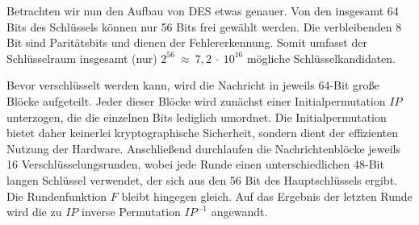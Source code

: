 Betrachten wir nun den Aufbau von DES etwas genauer. Von den insgesamt
64 Bits des Schlüssels können nur 56 Bits frei gewählt werden. Die
verbleibenden 8 Bit sind Paritätsbits und dienen der
Fehlererkennung. Somit umfasst der Schlüsselraum insgesamt (nur)
$2^{56}~\approx~7,2~\cdot~10^{16}$ mögliche Schlüsselkandidaten. 

Bevor verschlüsselt werden kann, wird die Nachricht in jeweils 64-Bit
große Blöcke aufgeteilt. Jeder dieser Blöcke wird zunächst einer
Initialpermutation $IP$ unterzogen, die die einzelnen Bits lediglich
umordnet. Die Initialpermutation bietet daher keinerlei kryptographische
Sicherheit, sondern dient der effizienten Nutzung der
Hardware. Anschließend durchlaufen die Nachrichtenblöcke jeweils 16
Verschlüsselungsrunden, wobei jede Runde  einen unterschiedlichen 48-Bit
langen Schlüssel verwendet, der sich aus den 56 Bit des Hauptschlüssels
ergibt. Die Rundenfunktion $F$ bleibt hingegen gleich. Auf das Ergebnis
der letzten Runde wird die zu $IP$ inverse Permutation $IP^{-1}$
angewandt. 

